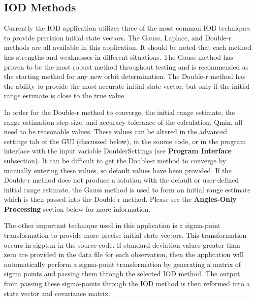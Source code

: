 \documentclass{article}
\begin{document}
		\subsection{IOD Methods}
		\hspace{0.45 cm}  Currently the IOD application utilizes three of the most common IOD techniques to provide precision initial state vectors. The Gauss, Laplace, and Double-r methods are all available in this application. It should be noted that each method has strengths
		and weaknesses in different situations. The Gauss method has proven to be the most robust method throughout testing and is recommended as the starting method for any new orbit determination. The Double-r method has the ability to provide the 
		most accurate initial state vector, but only if the initial range estimate is close to the true value. \par
		
		In order for the Double-r method to converge, the initial range estimate, the range estimation step-size, and accuracy tolerance of the calculation, Qmin, all need to be reasonable values. 
		These values can be altered in the advanced settings tab of the GUI (discussed below), in the source code, or in the program interface with the input variable DoublerSettings (see \textbf{Program Interface} subsection). It can be difficult to get the Double-r method to converge by manually entering these values,
		 so default values have been provided. If the Double-r method does not produce 
		a solution with the default or user-defined initial range estimate, the Gauss method is used to form an initial range estimate which is then passed into the Double-r method. Please see the \textbf{Angles-Only Processing} section below for more information. \par

		The other important technique used in this application is a sigma-point transformation to provide more precise initial state vectors. This transformation occurs in sigpt.m in the source code.
		If standard deviation values greater than zero are provided in the data file for each observation, then the application will automatically perform a sigma-point transformation by generating a matrix of sigma points and passing them through the selected IOD method. 
		The output from passing these sigma-points through the IOD method is then reformed into a state vector and covariance matrix. \par
		
\end{document}

